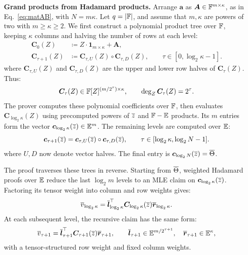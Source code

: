 \smallskip\noindent\textbf{Grand products from Hadamard products.}
Arrange \(\bm a\) as \(\bm A\in{\mathbb{F}}^{m\times\kappa}\), as in
Eq.~\eqref{eq:matAB}, with \(N=m\kappa\).
Let \(q=|{\mathbb{F}}|\), and assume that \(m,\kappa\) are powers
of two with \(m\geq\kappa\geq2\).
We first construct a polynomial product tree over \({\mathbb{F}}\),
keeping \(\kappa\) columns and halving the number of rows at each
level:
\begin{equation}
\begin{aligned}
    \bm C_0(Z)&\coloneqq Z \cdot \bm1_{m\times\kappa}+\bm A,\\
    \bm C_{\tau+1}(Z)
      &\coloneqq\bm C_{\tau,U}(Z)\circ\bm C_{\tau,D}(Z),
      \qquad \tau \in [0,\log_2\kappa-1].
\end{aligned}
\label{eq:packed-permutation-product-tree}
\end{equation}
where \(\bm C_{\tau,U}(Z)\) and \(\bm C_{\tau,D}(Z)\) are the upper
and lower row halves of \(\bm C_\tau(Z)\). Thus:
\[
    \bm C_\tau(Z)\in
       {\mathbb{F}}[Z]^{(m/2^\tau)\times\kappa},
    \qquad
    \deg_Z \bm C_\tau(Z)=2^\tau.
\]
The prover computes these polynomial coefficients over \({\mathbb{F}}\), then
evaluates \(\bm C_{\log_2\kappa}(Z)\) using precomputed powers of
\(\overline{z}\) and ${\mathbb{F}}-\mathbb{E}$ products.
Its \(m\) entries form the vector
\(\bm c_{\log_2\kappa}(\overline{z})\in\mathbb{E}^m\).
The remaining levels are computed over
\(\mathbb{E}\):
\[
    \bm c_{\tau+1}(\overline{z})
       =\bm c_{\tau,U}(\overline{z})\circ\bm c_{\tau,D}(\overline{z}),
    \qquad
    \tau \in [\log_2\kappa, \log_2 N-1].
\]
where \(U,D\) now denote vector halves. The final entry is
\(\bm c_{\log_2N}(\overline{z})=\overline{\Theta}\).

The proof traverses these trees in reverse. Starting from
\(\overline{\Theta}\), weighted Hadamard proofs over \(\mathbb{E}\)
reduce the last \(\log_2m\) levels to an MLE claim on
\(\bm c_{\log_2\kappa}(\overline{z})\).
Factoring its tensor weight into column and row weights gives:
\[
    \overline{v}_{\log_2\kappa}
      =\overline{\bm l}_{\log_2\kappa}^{\top}
         \bm C_{\log_2\kappa}(\overline{z})
         \overline{\bm r}_{\log_2\kappa}.
\]
At each subsequent level, the recursive claim has the same form:
\[
    \overline{v}_{\tau+1}
       =\overline{\bm l}_{\tau+1}^{\top}
          \bm C_{\tau+1}(\overline{z})\overline{\bm r}_{\tau+1},
    \qquad
    \overline{\bm l}_{\tau+1}\in\mathbb{E}^{m/2^{\tau+1}},
    \quad
    \overline{\bm r}_{\tau+1}\in\mathbb{E}^\kappa,
\]
with a tensor-structured row weight and fixed column weights.

